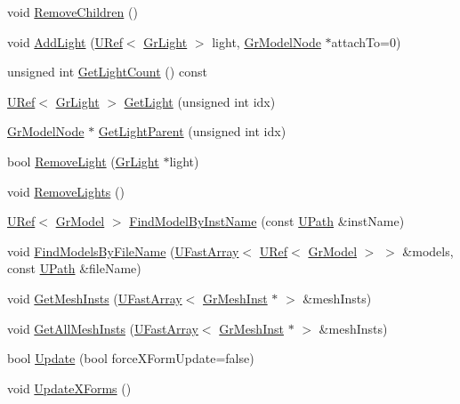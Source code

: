 \begin{CompactItemize}
\item 
void \hyperlink{class_gr_model_79e3bfacd56b97bf810b971f064d4a91}{RemoveChildren} ()
\item 
void \hyperlink{class_gr_model_4d7fbb62dd1022da5a5fd25c6cb0e1fc}{AddLight} (\hyperlink{class_u_ref}{URef}$<$ \hyperlink{class_gr_light}{GrLight} $>$ light, \hyperlink{class_gr_model_node}{GrModelNode} $\ast$attachTo=0)
\item 
unsigned int \hyperlink{class_gr_model_fbd44f70a2b06c82884eac31c40baeab}{GetLightCount} () const 
\item 
\hyperlink{class_u_ref}{URef}$<$ \hyperlink{class_gr_light}{GrLight} $>$ \hyperlink{class_gr_model_6f9177f0b2648997f0cb8dd4da0a481b}{GetLight} (unsigned int idx)
\item 
\hyperlink{class_gr_model_node}{GrModelNode} $\ast$ \hyperlink{class_gr_model_7ff4ed21e0a840da8ce5570b31b68a15}{GetLightParent} (unsigned int idx)
\item 
bool \hyperlink{class_gr_model_931e8f832b0858244d75b1dda2d5a70d}{RemoveLight} (\hyperlink{class_gr_light}{GrLight} $\ast$light)
\item 
void \hyperlink{class_gr_model_95abd2705120c297a44287fe1d173224}{RemoveLights} ()
\item 
\hyperlink{class_u_ref}{URef}$<$ \hyperlink{class_gr_model}{GrModel} $>$ \hyperlink{class_gr_model_edeff0285708b660e0c21e2cb65da360}{FindModelByInstName} (const \hyperlink{class_u_path}{UPath} \&instName)
\item 
void \hyperlink{class_gr_model_51f1bc0e7546b45969e3d40f600f7690}{FindModelsByFileName} (\hyperlink{class_u_fast_array}{UFastArray}$<$ \hyperlink{class_u_ref}{URef}$<$ \hyperlink{class_gr_model}{GrModel} $>$ $>$ \&models, const \hyperlink{class_u_path}{UPath} \&fileName)
\item 
void \hyperlink{class_gr_model_0b9f56be2def3c655a5a37ed425539c4}{GetMeshInsts} (\hyperlink{class_u_fast_array}{UFastArray}$<$ \hyperlink{class_gr_mesh_inst}{GrMeshInst} $\ast$ $>$ \&meshInsts)
\item 
void \hyperlink{class_gr_model_2c9c76c4d7715ab154fb9f89dd62d4d0}{GetAllMeshInsts} (\hyperlink{class_u_fast_array}{UFastArray}$<$ \hyperlink{class_gr_mesh_inst}{GrMeshInst} $\ast$ $>$ \&meshInsts)
\item 
bool \hyperlink{class_gr_model_dbb1580e4409efde8590f9a6feacd0c9}{Update} (bool forceXFormUpdate=false)
\item 
void \hyperlink{class_gr_model_fbc38dc0bd373a8b199535d55a06fc84}{UpdateXForms} ()
\item 

\end{CompactItemize}
